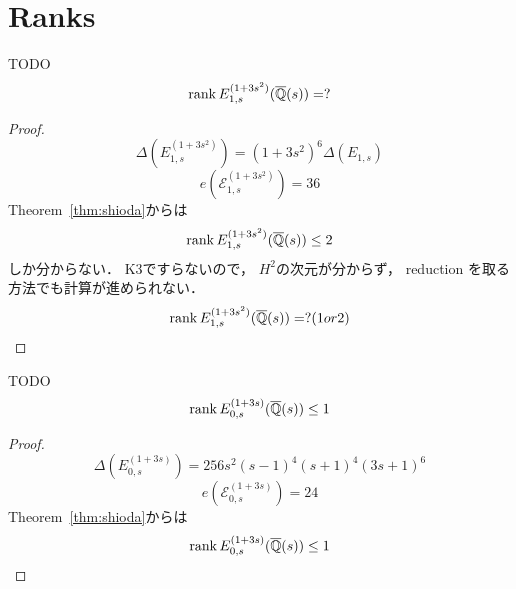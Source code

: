 \documentclass[main]{subfiles}
\begin{document}
\chapter{Ranks}

\begin{thm}
    TODO
    \begin{equation}
        \operatorname{rank} E_{1,s}^{(1 + 3s^{2})}(\overline{\mathbb{Q}}(s)) = ?
    \end{equation}
\end{thm}

\begin{proof}
    \begin{equation}
        \Delta(E_{1,s}^{(1 + 3s^{2})}) = (1 + 3s^{2})^{6} \Delta(E_{1,s})
    \end{equation}
    \begin{equation}
        e(\mathcal{E}_{1,s}^{(1 + 3s^{2})}) = 36
    \end{equation}
    Theorem~\ref{thm:shioda}からは
    \begin{equation}
        \operatorname{rank} E_{1,s}^{(1 + 3s^{2})}(\overline{\mathbb{Q}}(s)) \leq 2
    \end{equation}
    しか分からない．
    K3ですらないので， $H^2$の次元が分からず， reduction を取る方法でも計算が進められない．
    \begin{equation}
        \operatorname{rank} E_{1,s}^{(1 + 3s^{2})}(\overline{\mathbb{Q}}(s)) = ? (1 or 2)
    \end{equation}
\end{proof}


\begin{thm}
    TODO
    \begin{equation}
        \operatorname{rank} E_{0,s}^{(1 + 3s)}(\overline{\mathbb{Q}}(s)) \leq 1
    \end{equation}
\end{thm}
\begin{proof}
    \begin{equation}
        \Delta(E_{0,s}^{(1 + 3s)}) = 256s^{2}(s - 1)^{4}(s + 1)^{4}(3s + 1)^{6}
    \end{equation}
    \begin{equation}
        e(\mathcal{E}_{0,s}^{(1 + 3s)}) = 24
    \end{equation}
    Theorem~\ref{thm:shioda}からは
    \begin{equation}
        \operatorname{rank} E_{0,s}^{(1 + 3s)}(\overline{\mathbb{Q}}(s)) \leq 1
    \end{equation}
\end{proof}
\end{document}
